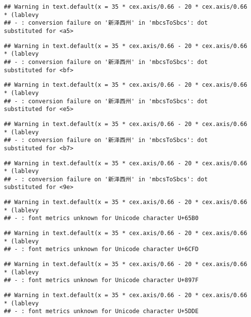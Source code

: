 \documentclass[
]{article}
\begin{document}
\begin{verbatim}
## Warning in text.default(x = 35 * cex.axis/0.66 - 20 * cex.axis/0.66 * (lablevy
## - : conversion failure on '新泽西州' in 'mbcsToSbcs': dot substituted for <a5>
\end{verbatim}

\begin{verbatim}
## Warning in text.default(x = 35 * cex.axis/0.66 - 20 * cex.axis/0.66 * (lablevy
## - : conversion failure on '新泽西州' in 'mbcsToSbcs': dot substituted for <bf>
\end{verbatim}

\begin{verbatim}
## Warning in text.default(x = 35 * cex.axis/0.66 - 20 * cex.axis/0.66 * (lablevy
## - : conversion failure on '新泽西州' in 'mbcsToSbcs': dot substituted for <e5>
\end{verbatim}

\begin{verbatim}
## Warning in text.default(x = 35 * cex.axis/0.66 - 20 * cex.axis/0.66 * (lablevy
## - : conversion failure on '新泽西州' in 'mbcsToSbcs': dot substituted for <b7>
\end{verbatim}

\begin{verbatim}
## Warning in text.default(x = 35 * cex.axis/0.66 - 20 * cex.axis/0.66 * (lablevy
## - : conversion failure on '新泽西州' in 'mbcsToSbcs': dot substituted for <9e>
\end{verbatim}

\begin{verbatim}
## Warning in text.default(x = 35 * cex.axis/0.66 - 20 * cex.axis/0.66 * (lablevy
## - : font metrics unknown for Unicode character U+65B0
\end{verbatim}

\begin{verbatim}
## Warning in text.default(x = 35 * cex.axis/0.66 - 20 * cex.axis/0.66 * (lablevy
## - : font metrics unknown for Unicode character U+6CFD
\end{verbatim}

\begin{verbatim}
## Warning in text.default(x = 35 * cex.axis/0.66 - 20 * cex.axis/0.66 * (lablevy
## - : font metrics unknown for Unicode character U+897F
\end{verbatim}

\begin{verbatim}
## Warning in text.default(x = 35 * cex.axis/0.66 - 20 * cex.axis/0.66 * (lablevy
## - : font metrics unknown for Unicode character U+5DDE
\end{verbatim}
\end{document}
